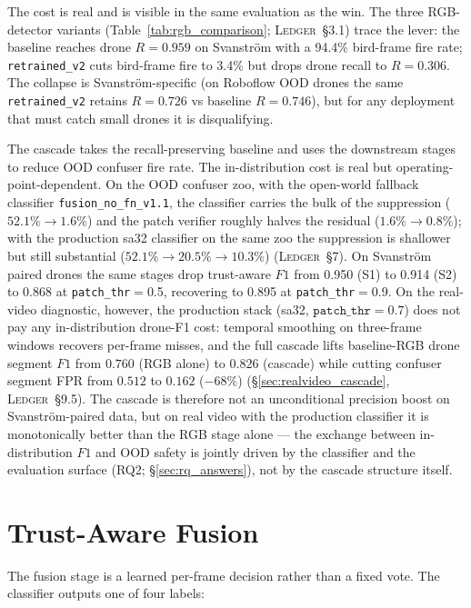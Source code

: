 \documentclass[12pt,a4paper,oneside,openright]{book}
\begin{document}
The cost is real and is visible in the same evaluation as the win. The three RGB-detector variants (Table~\ref{tab:rgb_comparison}; \textsc{Ledger}~\S3.1) trace the lever: the baseline reaches drone $R=0.959$ on Svanstr\"om with a 94.4\% bird-frame fire rate; \texttt{retrained\_v2} cuts bird-frame fire to 3.4\% but drops drone recall to $R=0.306$. The collapse is Svanstr\"om-specific (on Roboflow OOD drones the same \texttt{retrained\_v2} retains $R=0.726$ vs baseline $R=0.746$), but for any deployment that must catch small drones it is disqualifying.

The cascade takes the recall-preserving baseline and uses the downstream stages to reduce OOD confuser fire rate. The in-distribution cost is real but operating-point-dependent. On the OOD confuser zoo, with the open-world fallback classifier \texttt{fusion\_no\_fn\_v1.1}, the classifier carries the bulk of the suppression ($52.1\% \to 1.6\%$) and the patch verifier roughly halves the residual ($1.6\% \to 0.8\%$); with the production sa32 classifier on the same zoo the suppression is shallower but still substantial ($52.1\% \to 20.5\% \to 10.3\%$) (\textsc{Ledger}~\S7). On Svanstr\"om paired drones the same stages drop trust-aware $F1$ from 0.950 (S1) to 0.914 (S2) to 0.868 at \texttt{patch\_thr}$=$0.5, recovering to 0.895 at \texttt{patch\_thr}$=$0.9. On the real-video diagnostic, however, the production stack (sa32, $\mathtt{patch\_thr}=0.7$) does not pay any in-distribution drone-F1 cost: temporal smoothing on three-frame windows recovers per-frame misses, and the full cascade lifts baseline-RGB drone segment $F1$ from $0.760$ (RGB alone) to $0.826$ (cascade) while cutting confuser segment FPR from $0.512$ to $0.162$ ($-68\%$) (\S\ref{sec:realvideo_cascade}, \textsc{Ledger}~\S9.5). The cascade is therefore not an unconditional precision boost on Svanstr\"om-paired data, but on real video with the production classifier it is monotonically better than the RGB stage alone --- the exchange between in-distribution $F1$ and OOD safety is jointly driven by the classifier and the evaluation surface (RQ2; \S\ref{sec:rq_answers}), not by the cascade structure itself.

\section{Trust-Aware Fusion}
\label{sec:trust_fusion}

The fusion stage is a learned per-frame decision rather than a fixed vote. The classifier outputs one of four labels:
\end{document}

